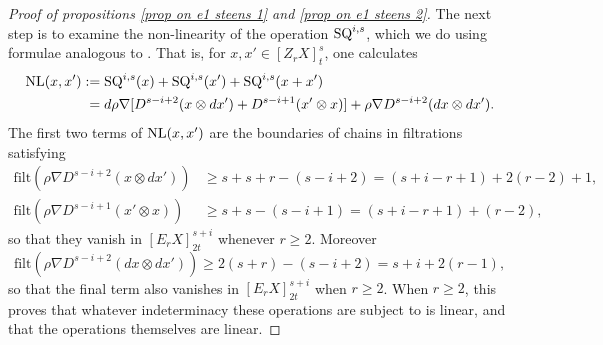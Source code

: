 \documentclass[11pt]{amsart} \renewcommand{\baselinestretch}{1.2}
\theoremstyle{plain}
\numberwithin{equation}{section} %
\theoremstyle{plain}
\numberwithin{equation}{chapter} %
\newcommand{\Nabla}{\nabla}
\newcommand{\E}[5]{[E^{#1}_{#2}#3]^{#4}_{#5}}
\newcommand{\EZdownup}[5]{[Z^{#2}_{#1}#3]^{#4}_{#5}}
\newcommand{\filt}{\mathrm{filt}}
\begin{document}
\begin{second quadrant homotopy sseq operations}
\begin{proof}[Proof of propositions \ref{prop on e1 steens 1} and \ref{prop on e1 steens 2}]
The next step is to examine the non-linearity of the operation $\textup{SQ}^{i,s}$, which we do using formulae analogous to \cite[(1.111) and (1.112)]{MR2245560}. That is, for $x,x'\in \EZdownup{r}{}{X}{s}{t}$, one calculates
\begin{alignat*}{2}
\textup{NL}(x,x'){}:={}&  \textup{SQ}^{i,s}(x)+\textup{SQ}^{i,s}(x')+\textup{SQ}^{i,s}(x+x') 
\\
{}={}&d\rho\Nabla [D^{s-i+2}(x\otimes dx')+D^{s-i+1}(x'\otimes x)]+\rho\Nabla D^{s-i+2}(dx\otimes dx') .
\end{alignat*}
%
The first two terms of $\textup{NL}(x,x')$ are the boundaries of chains in filtrations satisfying
\begin{align*}
\filt(\rho\Nabla D^{s-i+2}(x\otimes dx'))&\geq s+s+r-(s-i+2)=(s+i-r+1)+2(r-2)+1,\\
\filt(\rho\Nabla D^{s-i+1}(x'\otimes x))&\geq s+s-(s-i+1)=(s+i-r+1)+(r-2),
\end{align*}
so that they vanish in $\E{}{r}{X}{s+i}{2t}$ whenever $r\geq2$. Moreover
\[\filt(\rho\Nabla D^{s-i+2}(dx\otimes dx'))\geq 2(s+r)-(s-i+2)=s+i+2(r-1),\]
so that the final term also vanishes in $\E{}{r}{X}{s+i}{2t}$ when $r\geq2$.  When $r\geq2$, this proves that  whatever indeterminacy these operations are subject to is linear, and that the operations themselves are linear.


\end{proof}
\end{second quadrant homotopy sseq operations}
\end{document}
